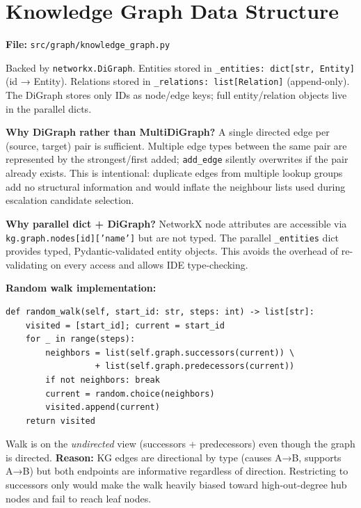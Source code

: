 \documentclass[11pt,a4paper]{article}
\begin{document}
\section{Knowledge Graph Data Structure}
\label{sec:kgds}

\textbf{File:} \texttt{src/graph/knowledge\_graph.py}

Backed by \texttt{networkx.DiGraph}. Entities stored in \texttt{\_entities: dict[str, Entity]} (id → Entity). Relations stored in \texttt{\_relations: list[Relation]} (append-only). The DiGraph stores only IDs as node/edge keys; full entity/relation objects live in the parallel dicts.

\textbf{Why DiGraph rather than MultiDiGraph?} A single directed edge per (source, target) pair is sufficient. Multiple edge types between the same pair are represented by the strongest/first added; \texttt{add\_edge} silently overwrites if the pair already exists. This is intentional: duplicate edges from multiple lookup groups add no structural information and would inflate the neighbour lists used during escalation candidate selection.

\textbf{Why parallel dict + DiGraph?} NetworkX node attributes are accessible via \texttt{kg.graph.nodes[id]['name']} but are not typed. The parallel \texttt{\_entities} dict provides typed, Pydantic-validated entity objects. This avoids the overhead of re-validating on every access and allows IDE type-checking.

\textbf{Random walk implementation:}

\begin{lstlisting}[style=py]
def random_walk(self, start_id: str, steps: int) -> list[str]:
    visited = [start_id]; current = start_id
    for _ in range(steps):
        neighbors = list(self.graph.successors(current)) \
                  + list(self.graph.predecessors(current))
        if not neighbors: break
        current = random.choice(neighbors)
        visited.append(current)
    return visited
\end{lstlisting}

Walk is on the \emph{undirected} view (successors + predecessors) even though the graph is directed. \textbf{Reason:} KG edges are directional by type (causes A→B, supports A→B) but both endpoints are informative regardless of direction. Restricting to successors only would make the walk heavily biased toward high-out-degree hub nodes and fail to reach leaf nodes.
\end{document}

